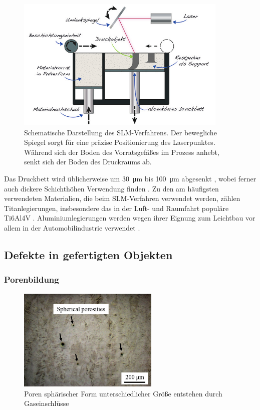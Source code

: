 		\begin{figure}[!ht]
			\centering
			\includegraphics[width=0.9\textwidth]{chapter/main/img/sls_slm.png}
			\caption[Schematische Darstellung des SLM-Verfahrens]{Schematische Darstellung des
			SLM-Verfahrens. Der bewegliche Spiegel sorgt für eine präzise Positionierung des
			Laserpunktes. Während sich der Boden des Vorrats\-gefäßes im Prozess anhebt, senkt
			sich der Boden des Druckraums ab. \cite{horsch20143d}}
			\label{fig:slm_sls}
		\end{figure}

		Das Druckbett wird üblicherweise um \SI{30}{\micro\meter} bis \SI{100}{\micro\meter}
		abgesenkt \cite{song2012effects}, wobei ferner auch dickere Schichthöhen Verwendung finden
		\cite{shi2016performance}. Zu den am häufigsten verwendeten Materialien, die beim
		SLM-Verfahren verwendet werden, zählen Titanlegierungen, insbesondere das in der Luft- und
		Raumfahrt populäre Ti6Al4V \cite{song2012effects,shi2016performance,brandl2012morphology}.
		Aluminiumlegierungen werden wegen ihrer Eignung zum Leichtbau vor allem in der
		Automobilindustrie verwendet \cite{yan2020comparative,zou2017study}.

	\subsection{Defekte in gefertigten Objekten}
		\label{subsec:defects}
		\subsubsection{Porenbildung}
		\begin{figure}[!ht]
			\centering
			\includegraphics[width=0.6\textwidth]{chapter/main/img/defects/porosities.png}
			\caption{Poren sphärischer Form unterschiedlicher Größe entstehen durch Gaseinschlüsse
			\cite{zhang2017defect}}
			\label{fig:defects_porosities}
		\end{figure}

